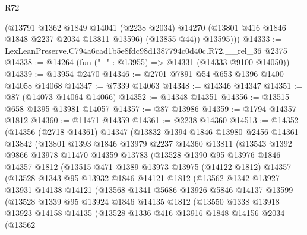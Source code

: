 \begin{lexlean}{R72}
\begin{coremodule}
          (@13791
            @1362
            @1849
            @14041
            (@2238 @2034)
            @14270
            (@13801 @416 @1846 @1848 @2237 @2034 @13811 @13596)
            (@13855 @44))
          @13595)))
@14333 := LexLeanPreserve.C794a6cad1b5e8fdc98d1387794c0d40c.R72.__rel_36 @2375
@14338 := @14264 (fun ("_" : @13955) => @14331 (@14333 @9100 @14050))
@14339 := @13954 @2470
@14346 := @2701 @7891 @54 @653 @1396 @1400 @14058 @14068
@14347 := @7339 @14063
@14348 := @14346 @14347
@14351 := @87 (@14073 @14064 @14066)
@14352 := @14348 @14351
@14356 := @13515 @658 @1395 @13981 @14057
@14357 := @87 @13986
@14359 := @1794 @14357 @1812
@14360 := @11471 @14359
@14361 := @2238 @14360
@14513 := @14352
    (@14356
      (@2718 @14361)
      @14347
      (@13832
        @1394
        @1846
        @13980
        @2456
        @14361
        @13842
        (@13801
          @1393
          @1846
          @13979
          @2237
          @14360
          @13811
          (@13543
            @1392
            @9866
            @13978
            @11470
            @14359
            @13783
            (@13528
              @1390
              @95
              @13976
              @1846
              @14357
              @1812
              (@13515
                @471
                @1389
                @13973
                @13975
                (@14122 @1812)
                @14357
                (@13528
                  @1343
                  @95
                  @13932
                  @1846
                  @14121
                  @1812
                  (@13562
                    @1342
                    @13927
                    @13931
                    @14138
                    @14121
                    (@13568
                      @1341
                      @5686
                      @13926
                      @5846
                      @14137
                      @13599
                      (@13528
                        @1339
                        @95
                        @13924
                        @1846
                        @14135
                        @1812
                        (@13550
                          @1338
                          @13918
                          @13923
                          @14158
                          @14135
                          (@13528
                            @1336
                            @416
                            @13916
                            @1848
                            @14156
                            @2034
                            (@13562

\end{coremodule}
\end{lexlean}
